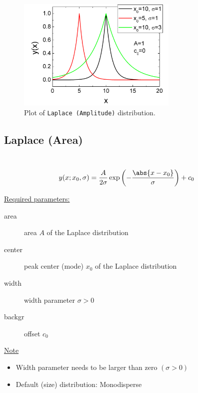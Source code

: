 \begin{figure}[htb]
\begin{center}
\includegraphics[width=0.6824\textwidth]{LaplaceAmplitude.png}
\end{center}
\caption{Plot of \texttt{Laplace (Amplitude)} distribution.}
\label{fig:LaplaceAmplitude}
\end{figure}

\clearpage
\subsection{Laplace (Area)} ~\\
\label{sec:LaplaceArea}
\begin{align}
y(x;x_0,\sigma) &= \frac{A}{2\sigma} \exp \left(
-\frac{\abs{x-x_0}}{\sigma}\right) + c_0
\end{align}

\underline{Required parameters:}
\begin{description}
    \item[area] area $A$ of the Laplace distribution
    \item[center] peak center (mode) $x_0$ of the Laplace distribution
    \item[width] width parameter $\sigma>0$
    \item[backgr] offset $c_0$
\end{description}

\underline{Note}
\begin{itemize}
  \item Width parameter needs to be larger than zero $(\sigma>0)$
  \item Default (size) distribution: Monodisperse
\end{itemize}


